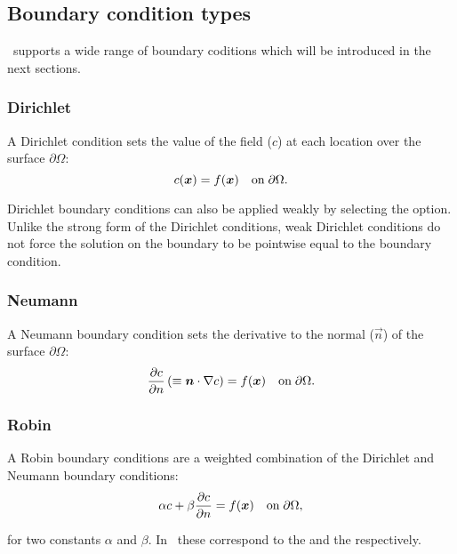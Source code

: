 \subsection{Boundary condition types}\label{Sect:BCs:types}
\fluidity\ supports a wide range of boundary coditions which will be introduced in the next sections.

\subsubsection{Dirichlet}

A Dirichlet condition sets the value of the field ($c$) at each location over the surface $\partial\Omega$:
\begin{equation*}
c({\mbox{\boldmath$x$}}) = f({\mbox{\boldmath$x$}}) \quad \textrm{on}\; \partial\Omega.
\end{equation*}

Dirichlet boundary conditions can also be applied weakly by selecting the 
option. Unlike the strong form of the Dirichlet conditions, weak Dirichlet
conditions do not force the solution on the boundary to be pointwise equal
to the boundary condition. 

\subsubsection{Neumann}

A Neumann boundary condition sets the derivative to the normal ($\vec n$) of the surface $\partial\Omega$:
\begin{equation*}
\frac{\partial c}{\partial n} \left(\equiv {\mbox{\boldmath$n$}}\cdot\nabla c\right) = f({\mbox{\boldmath$x$}}) \quad \textrm{on}\;  \partial\Omega.
\end{equation*}

\subsubsection{Robin}

A Robin boundary conditions are a weighted combination of the Dirichlet and Neumann boundary 
conditions:
\begin{equation*}
\alpha c + \beta\frac{\partial c}{\partial n} = f({\mbox{\boldmath$x$}}) \quad \textrm{on}\;  \partial\Omega,
\end{equation*}

for two constants $\alpha$ and $\beta$. In \fluidity\ these correspond to the 
and the  respectively.

